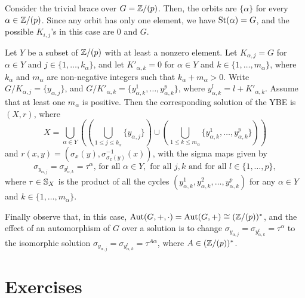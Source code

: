 \begin{example}\label{bracesp}
	{\rm Consider the trivial brace  over $G=\mathbb{Z}/(p)$. Then, the orbits
		are $\{\alpha\}$ for every $\alpha\in\mathbb{Z}/(p)$.
		Since any orbit has  only one element,  we have $\operatorname{St}(\alpha)=G$, and the possible $K_{i,j}$'s in this case are $0$ and $G$.
		
		Let $Y$ be a subset of $\mathbb{Z}/(p)$ with at least a nonzero element.
		Let $K_{\alpha,j}=G$ for $\alpha\in Y$ and $j\in\{1,\dots,k_{\alpha}\}$, and let $K'_{\alpha,k}=0$ for
		$\alpha\in Y$ and $k\in\{1,\dots,m_\alpha\}$, where $k_{\alpha}$ and $m_{\alpha}$ are non-negative integers such that $k_{\alpha}+m_{\alpha}>0$.
		Write $G/K_{\alpha,j}=\{y_{\alpha,j}\}$, and
		$G/K'_{\alpha,k}=\{y^1_{\alpha,k},\dots,y^p_{\alpha,k}\}$, where
		$y^{l}_{\alpha,k}=l+K'_{\alpha,k}$. Assume that at least one $m_{\alpha}$ is positive. Then the corresponding solution
		of the YBE is $(X,r)$, where
		$$
		X=\bigcup_{\alpha\in Y}\left( \left(\bigcup_{1\leq j\leq
			k_{\alpha}}\{ y_{\alpha,j}\}\right)\cup \left(\bigcup_{1\leq k\leq
			m_{\alpha}} \{y^1_{\alpha,k},\dots ,y^p_{\alpha,k}\}\right) \right)
		$$
		and $r(x,y)=(\sigma_x(y),\sigma^{-1}_{\sigma_{x}(y)}(x))$, with the
		sigma maps given by
		$$
		\sigma_{y_{\alpha,j}}=\sigma_{y^l_{\alpha,k}}=\tau^\alpha\text{, for
			all } \alpha\in Y,\text{ for all } j,k \text{ and for all }
		l\in\{1,\dots,p\},
		$$
		where $\tau\in \mathbb{S}_X$ is the product of all the cycles
		$(y^1_{\alpha,k},y^2_{\alpha,k},\dots,y^p_{\alpha,k})$ for any
		$\alpha\in Y$ and $k\in\{1,\dots,m_\alpha\}$.
		
		Finally observe that, in this case, $\operatorname{Aut}(G,+,\cdot)=\operatorname{Aut}(G,+)\cong
		(\mathbb{Z}/(p))^*$, and the effect of an automorphism of $G$ over a
		solution is to change
		$\sigma_{y_{\alpha,j}}=\sigma_{y^l_{\alpha,k}}=\tau^\alpha$ to the
		isomorphic solution
		$\sigma_{y_{\alpha,j}}=\sigma_{y^l_{\alpha,k}}=\tau^{A\alpha}$,
		where $A\in(\mathbb{Z}/(p))^*$.}
\end{example}






\section*{Exercises}

\begin{prob}
\end{prob}

\begin{prob}
\end{prob}


